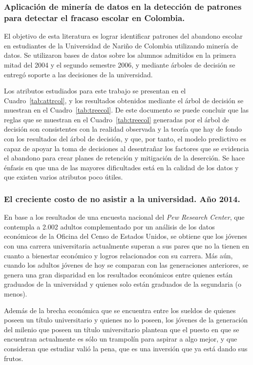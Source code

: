 \subsubsection{Aplicación de minería de datos en la detección de patrones para detectar el fracaso escolar en Colombia.}

El objetivo de esta literatura es lograr identificar patrones del abandono escolar en estudiantes de la Universidad de Nariño de Colombia utilizando minería de datos. Se utilizaron bases de datos sobre los alumnos admitidos en la primera mitad del 2004 y el segundo semestre 2006, y mediante árboles de decisión se entregó soporte a las decisiones de la universidad.

Los atributos estudiados para este trabajo se presentan en el Cuadro~\ref{tab:attrcol}, y los resultados obtenidos mediante el árbol de decisión se muestran en el Cuadro~\ref{tab:treecol}.
De este documento se puede concluir que las reglas que se muestran en el Cuadro~\ref{tab:treecol} generadas por el árbol de decisión son consistentes con la realidad observada y la teoría que hay de fondo con los resultados del árbol de decisión, y que, por tanto, el modelo predictivo es capaz de apoyar la toma de decisiones al desentrañar los factores que se evidencia el abandono para crear planes de retención y mitigación de la deserción. Se hace énfasis en que una de las mayores dificultades está en la calidad de los datos y que existen varios atributos poco útiles.

\subsubsection{El creciente costo de no asistir a la universidad. Año 2014.}
En base a los resultados de una encuesta nacional del \textit{Pew Research Center}, que contempla a 2.002 adultos complementado por un análisis de los datos económicos de la Oficina del Censo de Estados Unidos, se obtiene que los jóvenes con una carrera universitaria actualmente superan a sus pares que no la tienen en cuanto a bienestar económico y logros relacionados con su carrera. Más aún, cuando los adultos jóvenes de hoy se comparan con las generaciones anteriores, se genera una gran disparidad en los resultados económicos entre quienes están graduados de la universidad y quienes solo están graduados de la segundaria (o menos). 

Además de la brecha económica que se encuentra entre los sueldos de quienes poseen un título universitario y quienes no lo poseen, los jóvenes de la generación del milenio que poseen un título universitario plantean que el puesto en que se encuentran actualmente es sólo un trampolín para aspirar a algo mejor, y que consideran que estudiar valió la pena, que es una inversión que ya está dando sus frutos. 

